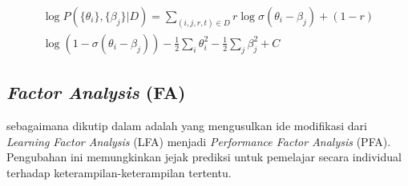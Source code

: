 \begin{multline}
\log P(\{\theta_i\}, \{\beta_j\}|D) = \sum_{(i,j,r,t) \in D} r\log \sigma(\theta_i - \beta_j) + (1-r) \\
\log(1 - \sigma(\theta_i - \beta_j)) - \frac{1}{2}\sum_i \theta_i^2 - \frac{1}{2}\sum_j \beta_j^2 + C \label{eq:rumus_irt_star}
\end{multline}


\subsection{\textit{Factor Analysis} (FA)}

\textcite{Pavlik2009} sebagaimana dikutip dalam \textcite{Minn2022} adalah yang mengusulkan ide modifikasi dari \textit{Learning Factor Analysis} (LFA) menjadi \textit{Performance Factor Analysis} (PFA). Pengubahan ini memungkinkan jejak prediksi untuk pemelajar secara individual terhadap keterampilan-keterampilan tertentu. 

